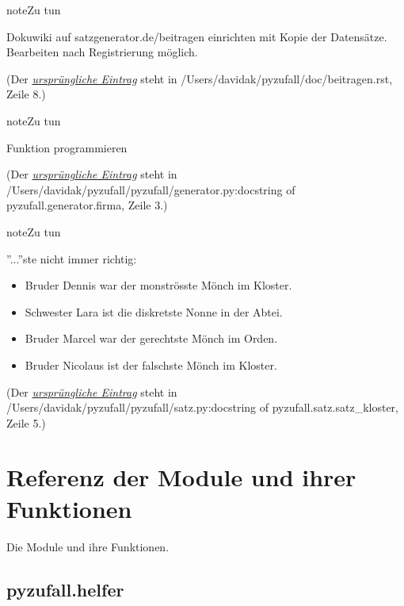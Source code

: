 \documentclass[a4paper,12pt,oneside]{sphinxmanual}
\begin{document}
\begin{notice}{note}{Zu tun}

Dokuwiki auf satzgenerator.de/beitragen einrichten mit Kopie der Datensätze. Bearbeiten nach Registrierung möglich.
\end{notice}

(Der {\hyperref[beitragen:index-0]{\emph{ursprüngliche Eintrag}}} steht in /Users/davidak/pyzufall/doc/beitragen.rst, Zeile 8.)

\begin{notice}{note}{Zu tun}

Funktion programmieren
\end{notice}

(Der {\hyperref[module:index-0]{\emph{ursprüngliche Eintrag}}} steht in /Users/davidak/pyzufall/pyzufall/generator.py:docstring of pyzufall.generator.firma, Zeile 3.)

\begin{notice}{note}{Zu tun}

''...''ste nicht immer richtig:
\begin{itemize}
\item {} 
Bruder Dennis war der monströsste Mönch im Kloster.

\item {} 
Schwester Lara ist die diskretste Nonne in der Abtei.

\item {} 
Bruder Marcel war der gerechtste Mönch im Orden.

\item {} 
Bruder Nicolaus ist der falschste Mönch im Kloster.

\end{itemize}
\end{notice}

(Der {\hyperref[module:index-1]{\emph{ursprüngliche Eintrag}}} steht in /Users/davidak/pyzufall/pyzufall/satz.py:docstring of pyzufall.satz.satz\_kloster, Zeile 5.)


\chapter{Referenz der Module und ihrer Funktionen}
\label{module::doc}\label{module:referenz-der-module-und-ihrer-funktionen}
Die Module und ihre Funktionen.


\section{pyzufall.helfer}
\label{module:pyzufall-helfer}\label{module:module-pyzufall.helfer}
\end{document}
